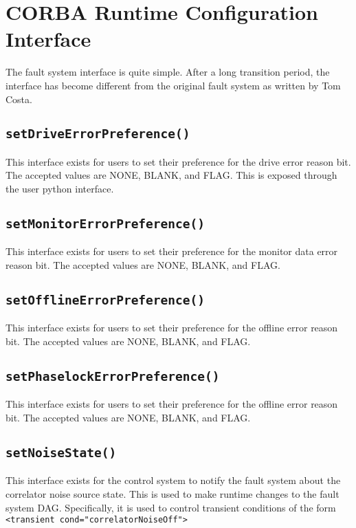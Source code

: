 \documentclass[letterpaper,12pt,oneside,pdftex]{article}
\begin{document}
\section{CORBA Runtime Configuration Interface}

The fault system interface is quite simple. After a long transition period, the
interface has become different from the original fault system as written by Tom
Costa.

\subsection{\texttt{setDriveErrorPreference()}}
This interface exists for users to set their preference for the drive error
reason bit. The accepted values are NONE, BLANK, and FLAG. This is exposed
through the user python interface.

\subsection{\texttt{setMonitorErrorPreference()}}
This interface exists for users to set their preference for the monitor data
error reason bit. The accepted values are NONE, BLANK, and FLAG.

\subsection{\texttt{setOfflineErrorPreference()}}
This interface exists for users to set their preference for the offline error
reason bit. The accepted values are NONE, BLANK, and FLAG.

\subsection{\texttt{setPhaselockErrorPreference()}}
This interface exists for users to set their preference for the offline error
reason bit. The accepted values are NONE, BLANK, and FLAG.

\subsection{\texttt{setNoiseState()}}
This interface exists for the control system to notify the fault system about
the correlator noise source state. This is used to make runtime changes to the
fault system DAG. Specifically, it is used to control transient conditions of
the form \verb|<transient cond="correlatorNoiseOff">|
\end{document}

